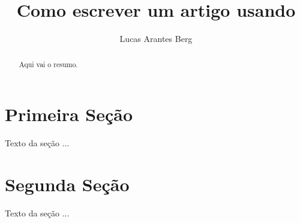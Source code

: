 \documentclass[]{article}
\title{Como escrever um artigo usando \Latex}
\author{Lucas Arantes Berg}
\begin{document}
\maketitle

\begin{abstract}
	Aqui vai o resumo.
\end{abstract}

\section{Primeira Seção}
	Texto da seção ...
	
\section{Segunda Seção}
	Texto da seção ...
\end{document}
